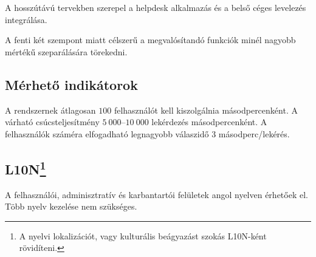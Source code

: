 A hosszútávú tervekben szerepel a \foreignlanguage{british}{helpdesk} alkalmazás és a belső céges levelezés integrálása.

A fenti két szempont miatt célszerű a megvalósítandó funkciók minél nagyobb mértékű szeparálására törekedni.


\subsection{Mérhető indikátorok}\label{sec:indikatorok}
A rendszernek átlagosan $100$ felhasználót kell kiszolgálnia másodpercenként. A várható csúcsteljesítmény $5~000$--$10~000$ lekérdezés másodpercenként. A felhasználók száméra elfogadható legnagyobb válaszidő 3 másodperc/lekérés.


\subsection[L10N]{L10N\footnote{A nyelvi lokalizációt, vagy kulturális beágyazást szokás L10N-ként rövidíteni.}}
A felhasználói, adminisztratív és karbantartói felületek angol nyelven érhetőek el. Több nyelv kezelése nem szükséges.
